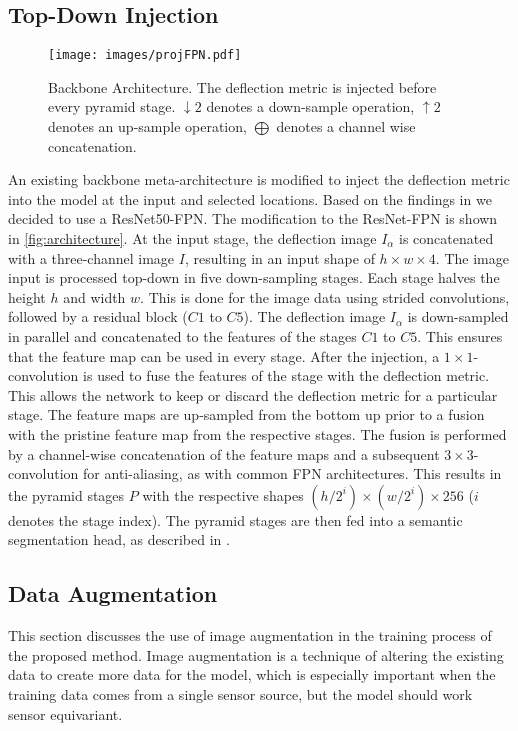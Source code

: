 \subsection{Top-Down Injection}
\label{sec:backbone}

\begin{figure}[!h] 
    \centering
    \texttt{[image: images/projFPN.pdf]}
    \caption{Backbone Architecture. The deflection metric is injected before every pyramid stage. $\downarrow2$ denotes a down-sample operation, $\uparrow2$ denotes an up-sample operation, $\bigoplus$ denotes a channel wise concatenation.}
    \label{fig:architecture}
\end{figure}
An existing backbone meta-architecture is modified to inject the deflection metric into the model at the input and selected locations. Based on the findings in \cite{wang2021solo}\cite{wang2020solov2} we decided to use a ResNet50-FPN. The modification to the ResNet-FPN is shown in \autoref{fig:architecture}. At the input stage, the deflection image $I_{\alpha}$ is concatenated with a three-channel image $I$, resulting in an input shape of $h\times w \times 4$. The image input is processed top-down in five down-sampling stages. Each stage halves the height $h$ and width $w$. This is done for the image data using strided convolutions, followed by a residual block ($C1$ to $C5$). The deflection image $I_{\alpha}$ is down-sampled in parallel and concatenated to the features of the stages $C1$ to $C5$. This ensures that the feature map can be used in every stage. After the injection, a $1\times1$-convolution is used to fuse the features of the stage with the deflection metric. This allows the network to keep or discard the deflection metric for a particular stage. The feature maps are up-sampled from the bottom up prior to a fusion with the pristine feature map from the respective stages. The fusion is performed by a channel-wise concatenation of the feature maps and a subsequent $3\times3$-convolution for anti-aliasing, as with common FPN architectures. This results in the pyramid stages $P$ with the respective shapes $(h/2^{i})\times( w/2^{i})\times256$ ($i$ denotes the stage index). The pyramid stages are then fed into a semantic segmentation head, as described in \cite{LinFPN}.

\subsection{Data Augmentation}
This section discusses the use of image augmentation in the training process of the proposed method. Image augmentation is a technique of altering the existing data to create more data for the model, which is especially important when the training data comes from a single sensor source, but the model should work sensor equivariant.

